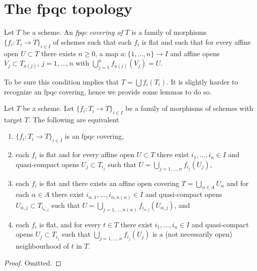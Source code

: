 \section{The fpqc topology}
\label{section-fpqc}

\begin{definition}
\label{definition-fpqc-covering}
Let $T$ be a scheme. An {\it fpqc covering of $T$} is a family
of morphisms $\{f_i : T_i \to T\}_{i \in I}$ of schemes
such that each $f_i$ is flat and such that for every affine open
$U \subset T$ there exists $n \geq 0$, a map
$a : \{1, \ldots, n\} \to I$ and affine opens
$V_j \subset T_{a(j)}$, $j = 1, \ldots, n$
with $\bigcup_{j = 1}^n f_{a(j)}(V_j) = U$.
\end{definition}

\noindent
To be sure this condition implies that $T = \bigcup f_i(T_i)$.
It is slightly harder to recognize an fpqc covering, hence we provide
some lemmas to do so.

\begin{lemma}
\label{lemma-recognize-fpqc-covering}
Let $T$ be a scheme. Let $\{f_i : T_i \to T\}_{i \in I}$ be a family of
morphisms of schemes with target $T$. The following are equivalent
\begin{enumerate}
\item $\{f_i : T_i \to T\}_{i \in I}$ is an fpqc covering,
\item each $f_i$ is flat and for every affine open $U \subset T$
there exist $i_1, \ldots, i_n \in I$ and quasi-compact opens
$U_j \subset T_{i_j}$ such that $U = \bigcup_{j = 1, \ldots, n} f_{i_j}(U_j)$,
\item each $f_i$ is flat and there exists an affine open covering
$T = \bigcup_{\alpha \in A} U_\alpha$ and for each $\alpha \in A$
there exist $i_{\alpha, 1}, \ldots, i_{\alpha, n(\alpha)} \in I$
and quasi-compact opens $U_{\alpha, j} \subset T_{i_{\alpha, j}}$ such that
$U = \bigcup_{j = 1, \ldots, n(\alpha)} f_{i_{\alpha, j}}(U_{\alpha, j})$, and
\item each $f_i$ is flat, and for every $t \in T$ there exist
$i_1, \ldots, i_n \in I$ and quasi-compact opens $U_j \subset T_{i_j}$
such that $\bigcup_{j = 1, \ldots, n} f_{i_j}(U_j)$ is a
(not necessarily open) neighbourhood of $t$ in $T$.
\end{enumerate}
\end{lemma}

\begin{proof}
Omitted.
\end{proof}

